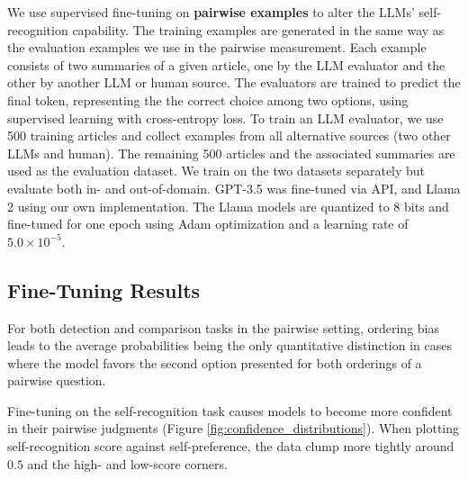 \documentclass{article}
\theoremstyle{plain}
\theoremstyle{definition}
\theoremstyle{remark}
\begin{document}
We use supervised fine-tuning on \textbf{pairwise examples} to alter the LLMs' self-recognition capability.
The training examples are generated in the same way as the evaluation examples we use in the pairwise measurement.
Each example consists of two summaries of a given article, one by the LLM evaluator and the other by another LLM or human source.
The evaluators are trained to predict the final token, representing the the correct choice among two options, using supervised learning with cross-entropy loss.
To train an LLM evaluator, we use 500 training articles and collect examples from all alternative sources (two other LLMs and human). The remaining 500 articles and the associated summaries are used as the evaluation dataset.
We train on the two datasets separately but evaluate both in- and out-of-domain.
GPT-3.5 was fine-tuned via API, and Llama 2 using our own implementation. The Llama models are quantized to 8 bits and fine-tuned for one epoch using Adam optimization and a learning rate of $5.0 \times 10^{-5}$.

\subsection{Fine-Tuning Results}

For both detection and comparison tasks in the pairwise setting, ordering bias leads to the average probabilities being the only quantitative distinction in cases where the model favors the second option presented for both orderings of a pairwise question.

Fine-tuning on the self-recognition task causes models to become more confident in their pairwise judgments (Figure \ref{fig:confidence_distributions}). When plotting self-recognition score against self-preference, the data clump more tightly around $0.5$ and the high- and low-score corners.
\end{document}
